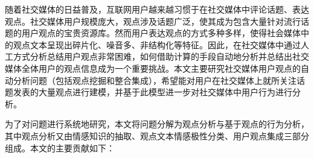 \begin{cabstract}
随着社交媒体的日益普及，互联网用户越来越习惯于在社交媒体中评论话题、表达观点。社交媒体用户规模庞大，观点涉及话题广泛，使其成为包含大量针对流行话题的用户观点的宝贵资源库。然而用户表达观点的方式多种多样，使得社会媒体中的观点文本呈现出碎片化、噪音多、非结构化等特征。因此，在社交媒体中通过人工方式分析总结用户观点非常困难，如何借助计算的手段自动地分析并总结出社交媒体全体用户的观点信息成为一个重要挑战。本文主要研究社交媒体用户观点的自动分析问题（包括观点挖掘和整合集成），希望能对用户在社交媒体上就所关注话题发表的大量观点进行建模，并基于此模型进一步对社交媒体中用户行为进行分析。

为了对问题进行系统地研究，本文将问题分解为观点分析与基于观点的行为分析，其中观点分析又由情感知识的抽取、观点文本情感极性分类、用户观点集成三部分组成。本文的主要贡献如下：


\end{cabstract}

